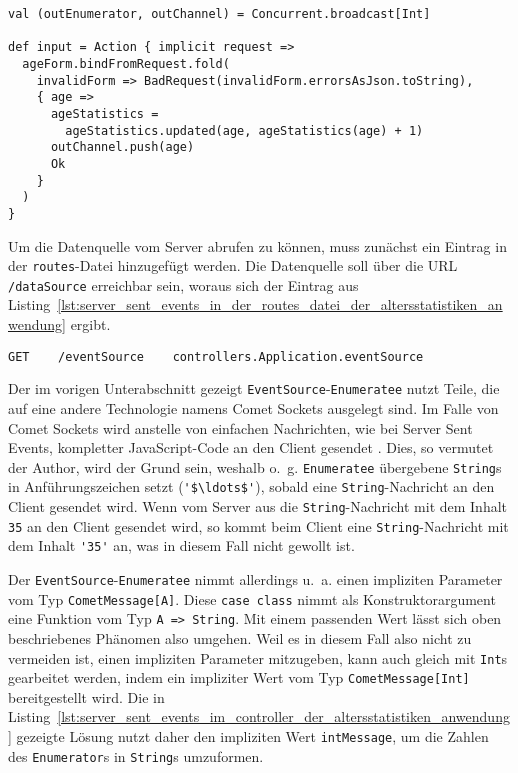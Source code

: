 \begin{lstlisting}[caption=Server Sent Events in der input-Action der Altersstatistiken-Anwendung, label=lst:server_sent_events_in_der_input_action_der_altersstatistiken_anwendung]
val (outEnumerator, outChannel) = Concurrent.broadcast[Int]

def input = Action { implicit request =>
  ageForm.bindFromRequest.fold(
    invalidForm => BadRequest(invalidForm.errorsAsJson.toString),
    { age =>
      ageStatistics =
        ageStatistics.updated(age, ageStatistics(age) + 1)
      outChannel.push(age)
      Ok
    }
  )
}
\end{lstlisting}

Um die Datenquelle vom Server abrufen zu können, muss zunächst ein Eintrag in der \lstinline|routes|-Datei hinzugefügt werden.
Die Datenquelle soll über die URL \lstinline|/dataSource| erreichbar sein, woraus sich der Eintrag aus Listing~\ref{lst:server_sent_events_in_der_routes_datei_der_altersstatistiken_anwendung} ergibt.

\begin{lstlisting}[caption=Server Sent Events in der routes-Datei der Altersstatistiken-Anwendung, label=lst:server_sent_events_in_der_routes_datei_der_altersstatistiken_anwendung]
GET    /eventSource    controllers.Application.eventSource
\end{lstlisting}

Der im vorigen Unterabschnitt gezeigt \lstinline|EventSource|-\lstinline|Enumeratee| nutzt Teile, die auf eine andere Technologie namens Comet Sockets ausgelegt sind.
Im Falle von Comet Sockets wird anstelle von einfachen Nachrichten, wie bei Server Sent Events, kompletter JavaScript-Code an den Client gesendet \cite[vgl.][]{play_comet_sockets}.
Dies, so vermutet der Author, wird der Grund sein, weshalb o.~g. \lstinline|Enumeratee| übergebene \lstinline|String|s in Anführungszeichen setzt (\lstinline[mathescape]|'$\ldots$'|), sobald eine \lstinline|String|-Nachricht an den Client gesendet wird.
Wenn vom Server aus die \lstinline|String|-Nachricht mit dem Inhalt \lstinline|35| an den Client gesendet wird, so kommt beim Client eine \lstinline|String|-Nachricht mit dem Inhalt \lstinline|'35'| an, was in diesem Fall nicht gewollt ist.

Der \lstinline|EventSource|-\lstinline|Enumeratee| nimmt allerdings u.~a. einen impliziten Parameter vom Typ \lstinline|CometMessage[A]|.
Diese \lstinline|case class| nimmt als Konstruktorargument eine Funktion vom Typ \lstinline|A => String|.
Mit einem passenden Wert lässt sich oben beschriebenes Phänomen also umgehen.
Weil es in diesem Fall also nicht zu vermeiden ist, einen impliziten Parameter mitzugeben, kann auch gleich mit \lstinline|Int|s gearbeitet werden, indem ein impliziter Wert vom Typ \lstinline|CometMessage[Int]| bereitgestellt wird.
Die in Listing~\ref{lst:server_sent_events_im_controller_der_altersstatistiken_anwendung} gezeigte Lösung nutzt daher den impliziten Wert \lstinline|intMessage|, um die Zahlen des \lstinline|Enumerator|s in \lstinline|String|s umzuformen.

